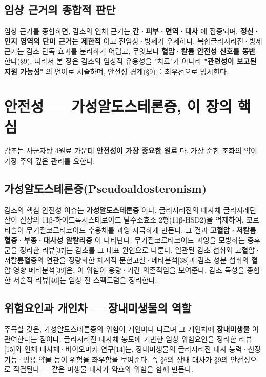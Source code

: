 \documentclass[11pt,oneside]{book}
\begin{document}
\subsection{임상 근거의 종합적 판단}
임상 근거를 종합하면, 감초의 인체 근거는 \textbf{간·피부·면역·대사} 에 집중되며, \textbf{정신·인지 영역의 단미 근거는 제한적} 이고 전임상·방제가 우세하다. 복합글리시리진·방제 근거는 감초 단독 효과를 분리하기 어렵고, 무엇보다 \textbf{혈압·칼륨 안전성 신호를 동반} 한다(§9). 따라서 본 장은 감초의 임상적 유용성을 "치료"가 아니라 \textbf{"관련성이 보고된 지원 가능성"} 의 언어로 서술하며, 안전성 경계(§9)를 최우선으로 명시한다.

\section{안전성 — 가성알도스테론증, 이 장의 핵심}
감초는 사군자탕 4원료 가운데 \textbf{안전성이 가장 중요한 원료} 다. 가장 순한 조화의 약이 가장 주의 깊은 관리를 요한다.

\subsection{가성알도스테론증(Pseudoaldosteronism)}
감초의 핵심 안전성 이슈는 \textbf{가성알도스테론증} 이다. 글리시리진의 대사체 글리시레틴산이 신장의 11β-하이드록시스테로이드 탈수소효소 2형(11β-HSD2)을 억제하여, 코르티솔이 무기질코르티코이드 수용체를 과잉 자극하게 만든다. 그 결과 \textbf{고혈압·저칼륨혈증·부종·대사성 알칼리증} 이 나타난다. 무기질코르티코이드 과잉을 모방하는 증후군을 정리한 리뷰[37]는 감초를 그 대표 원인으로 다룬다. 일관된 감초 섭취와 고혈압·저칼륨혈증의 연관을 정량화한 체계적 문헌고찰·메타분석[38]과 감초 성분 섭취의 혈압 영향 메타분석[39]은, 이 위험이 용량·기간 의존적임을 보여준다. 감초 독성을 종합한 서술적 리뷰[40]는 임상 전 스펙트럼을 정리한다.

\subsection{위험요인과 개인차 — 장내미생물의 역할}
주목할 것은, 가성알도스테론증의 위험이 개인마다 다르며 그 개인차에 \textbf{장내미생물} 이 관여한다는 점이다. 글리시리진-대사체 농도에 기반한 임상 위험요인을 정리한 리뷰[15]와 인체 대사체·바이오마커 연구[14]는, 장내미생물의 글리시리진 대사 능력·신장 기능·병용 약물 등이 위험을 좌우함을 보여준다. 즉 §6의 장내 대사가 §9의 안전성으로 직결된다 — 같은 미생물 대사가 약효와 위험을 함께 만든다.
\end{document}
